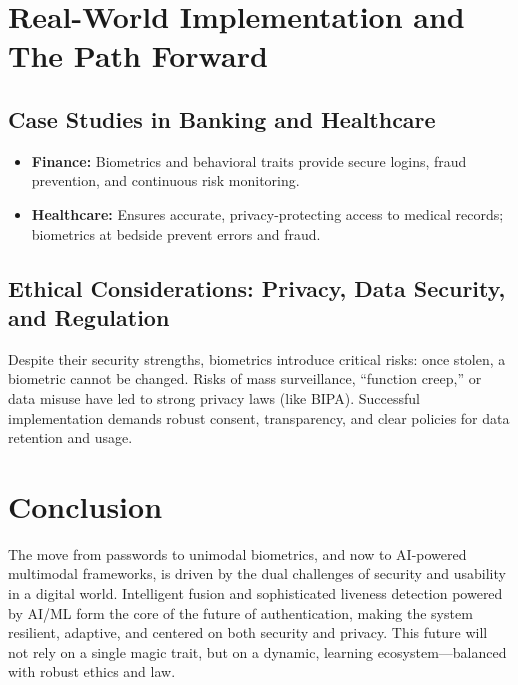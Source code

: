 \section{Real-World Implementation and The Path Forward}

\subsection{Case Studies in Banking and Healthcare}
\begin{itemize}
    \item \textbf{Finance:} Biometrics and behavioral traits provide secure logins, fraud prevention, and continuous risk monitoring.
    \item \textbf{Healthcare:} Ensures accurate, privacy-protecting access to medical records; biometrics at bedside prevent errors and fraud.
\end{itemize}

\subsection{Ethical Considerations: Privacy, Data Security, and Regulation}
Despite their security strengths, biometrics introduce critical risks: once stolen, a biometric cannot be changed. Risks of mass surveillance, “function creep,” or data misuse have led to strong privacy laws (like BIPA). Successful implementation demands robust consent, transparency, and clear policies for data retention and usage.

\section*{Conclusion}
The move from passwords to unimodal biometrics, and now to AI-powered multimodal frameworks, is driven by the dual challenges of security and usability in a digital world. Intelligent fusion and sophisticated liveness detection powered by AI/ML form the core of the future of authentication, making the system resilient, adaptive, and centered on both security and privacy. This future will not rely on a single magic trait, but on a dynamic, learning ecosystem—balanced with robust ethics and law.

